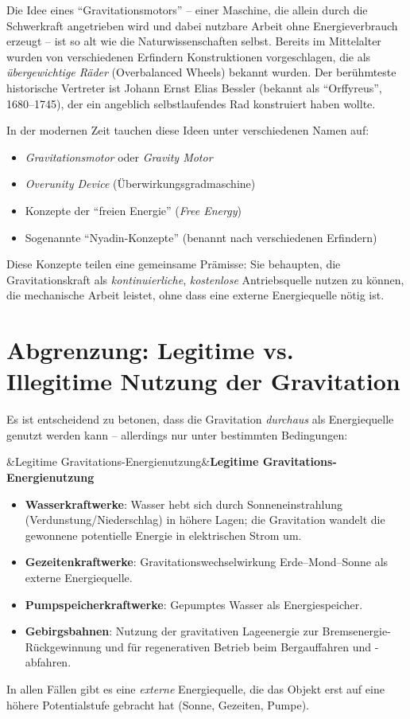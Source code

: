 ﻿\documentclass[12pt, a4paper]{report}
\newenvironment{hinweis}[1][]{%
  \begin{hinweisframe}\sloppy%
  \ifx&#1&\else\textbf{#1}\par\smallskip\fi}{\end{hinweisframe}}
\theoremstyle{definition}
\theoremstyle{remark}
\begin{document}
Die Idee eines ``Gravitationsmotors'' -- einer Maschine, die allein durch die
Schwerkraft angetrieben wird und dabei nutzbare Arbeit ohne Energieverbrauch
erzeugt -- ist so alt wie die Naturwissenschaften selbst. Bereits im Mittelalter
wurden von verschiedenen Erfindern Konstruktionen vorgeschlagen, die als
\emph{übergewichtige Räder} (Overbalanced Wheels) bekannt wurden. Der berühmteste
historische Vertreter ist Johann Ernst Elias Bessler (bekannt als ``Orffyreus'',
1680--1745), der ein angeblich selbstlaufendes Rad konstruiert haben wollte.

In der modernen Zeit tauchen diese Ideen unter verschiedenen Namen auf:
\begin{itemize}[leftmargin=2em]
  \item \emph{Gravitationsmotor} oder \emph{Gravity Motor}
  \item \emph{Overunity Device} (Überwirkungsgradmaschine)
  \item Konzepte der ``freien Energie'' (\emph{Free Energy})
  \item Sogenannte ``Nyadin-Konzepte'' (benannt nach verschiedenen Erfindern)
\end{itemize}

Diese Konzepte teilen eine gemeinsame Prämisse: Sie behaupten, die Gravitationskraft
als \emph{kontinuierliche}, \emph{kostenlose} Antriebsquelle nutzen zu können, die
mechanische Arbeit leistet, ohne dass eine externe Energiequelle nötig ist.

\section{Abgrenzung: Legitime vs. Illegitime Nutzung der Gravitation}

Es ist entscheidend zu betonen, dass die Gravitation \emph{durchaus} als Energiequelle
genutzt werden kann -- allerdings nur unter bestimmten Bedingungen:

\begin{hinweis}[Legitime Gravitations-Energienutzung]
  \begin{itemize}
    \item \textbf{Wasserkraftwerke}: Wasser hebt sich durch Sonneneinstrahlung
          (Verdunstung/Niederschlag) in höhere Lagen; die Gravitation
          wandelt die gewonnene potentielle Energie in elektrischen Strom um.
    \item \textbf{Gezeitenkraftwerke}: Gravitations\-wechsel\-wirkung
          Erde--Mond--Sonne als externe Energiequelle.
    \item \textbf{Pumpspeicherkraftwerke}: Gepumptes Wasser als Energiespeicher.
    \item \textbf{Gebirgsbahnen}: Nutzung der gravitativen Lageenergie
          zur Bremsenergie-Rückgewinnung und für regenerativen Betrieb beim
          Berg\-auf\-fahren und -ab\-fahren.
  \end{itemize}
  In allen Fällen gibt es eine \emph{externe} Energiequelle, die das Objekt erst auf
  eine höhere Potentialstufe gebracht hat (Sonne, Gezeiten, Pumpe).
\end{hinweis}
\end{document}
